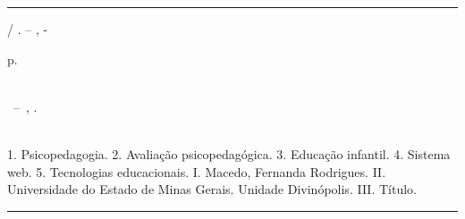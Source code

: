 \begin{fichacatalografica}
	\vspace*{\fill}					%
	\hrule							%
	\begin{center}					%
	\begin{minipage}[c]{12.5cm}		%
	
	\imprimirautor
	
	\hspace{0.5cm} \imprimirtitulo  / \imprimirautor. --
	\imprimirlocal, \imprimirdata-
	
	\hspace{0.5cm} \pageref{LastPage} p.\\
	
	\hspace{0.5cm} \imprimirorientadorRotulo~\imprimirorientador\\
	
	\hspace{0.5cm}
	\parbox[t]{\textwidth}{\imprimirtipotrabalho~--~\imprimirinstituicao,
	\imprimirdata.}\\
	
	\hspace{0.5cm}
		1. Psicopedagogia.
		2. Avaliação psicopedagógica.
		3. Educação infantil.
		4. Sistema web.
		5. Tecnologias educacionais.
		I. Macedo, Fernanda Rodrigues.
		II. Universidade do Estado de Minas Gerais. Unidade Divinópolis.
		III. Título.\\

	\end{minipage}
	\end{center}
	\hrule
\end{fichacatalografica}